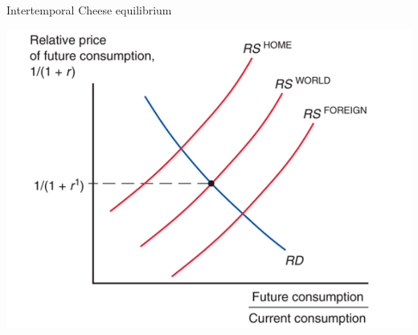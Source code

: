 \documentclass[ignorenonframetext,]{beamer}
\begin{document}
\begin{frame}{Intertemporal Cheese equilibrium}

    \includegraphics[scale=0.25]{intertemporal_cheese.png}

\end{frame}
\end{document}
